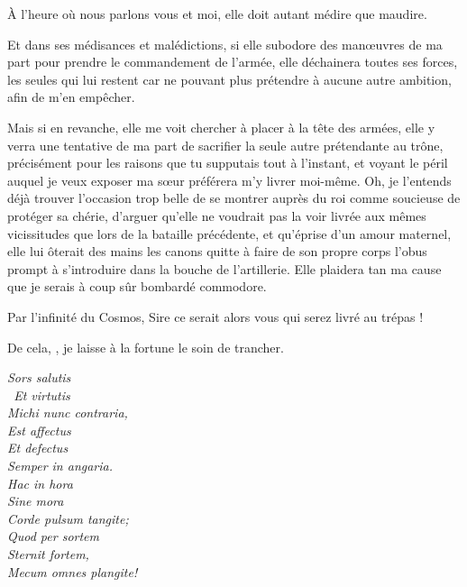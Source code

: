 \begin{drama}
  \alexasspeaks À l’heure où nous parlons vous et moi, elle doit autant médire que maudire.

   \elenaspeaks Et dans ses médisances et malédictions, si elle subodore des manœuvres de ma part pour prendre le commandement de l’armée, elle déchainera toutes ses forces, les seules qui lui restent car ne pouvant plus prétendre à aucune autre ambition, afin de m’en empêcher.

  Mais si en revanche, elle me voit chercher à placer \ela{} à la tête des armées, elle y verra une tentative de ma part de sacrifier la seule autre prétendante au trône, précisément pour les raisons que tu supputais tout à l’instant, et voyant le péril auquel je veux exposer ma sœur préférera m’y livrer moi-même. Oh, je l’entends déjà trouver l’occasion trop belle de se montrer auprès du roi comme soucieuse de protéger sa \princesse{} chérie, d’arguer qu’elle ne voudrait pas la voir livrée aux mêmes vicissitudes que lors de la bataille précédente, et qu’éprise d’un amour maternel, elle lui ôterait des mains les canons quitte à faire de son propre corps l’obus prompt à s’introduire dans la bouche de l’artillerie. Elle plaidera tan ma cause que je serais à coup sûr bombardé commodore.

  \alexasspeaks Par l’infinité du Cosmos, Sire ce serait alors vous qui serez livré au trépas !

  \elenaspeaks  De cela, \alexas, je laisse à la fortune le soin de trancher.

%


  \choirspeaks
  \begin{minipage}[t]{\linewidth}
    \em
    Sors salutis\endnote{\carminaendnote}\\\
    Et virtutis\\
    Michi nunc contraria,\\
    Est affectus\\
    Et defectus\\
    Semper in angaria.\\
    Hac in hora\\
    Sine mora\\
    Corde pulsum tangite;\\
    Quod per sortem\\
    Sternit fortem,\\
    Mecum omnes plangite!
  \end{minipage}



\end{drama}

